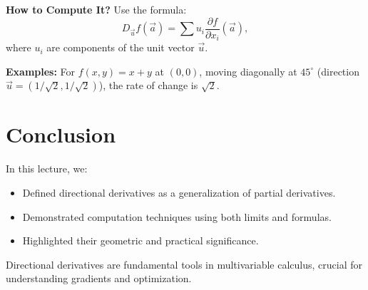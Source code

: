 \documentclass{article}
\begin{document}
\textbf{How to Compute It?}
Use the formula:
\[
  D_{\vec{u}} f(\vec{a}) = \sum u_i \frac{\partial f}{\partial x_i}(\vec{a}),
\]
where $u_i$ are components of the unit vector $\vec{u}$.

\textbf{Examples:}
For $f(x, y) = x + y$ at $(0, 0)$, moving diagonally at $45^\circ$ (direction $\vec{u} = (1/\sqrt{2}, 1/\sqrt{2})$), the rate of change is $\sqrt{2}$.

\section*{Conclusion}

In this lecture, we:
\begin{itemize}
  \item Defined directional derivatives as a generalization of partial derivatives.
  \item Demonstrated computation techniques using both limits and formulas.
  \item Highlighted their geometric and practical significance.
\end{itemize}

Directional derivatives are fundamental tools in multivariable calculus, crucial for understanding gradients and optimization.
\end{document}
